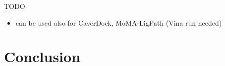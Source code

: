 \documentclass{vgtc}                          %
\begin{document}
TODO
\begin{itemize}
  \item can be used also for CaverDock, MoMA-LigPath (Vina run needed)
\end{itemize}

\section{Conclusion}


%

%
%
%


\end{document}
